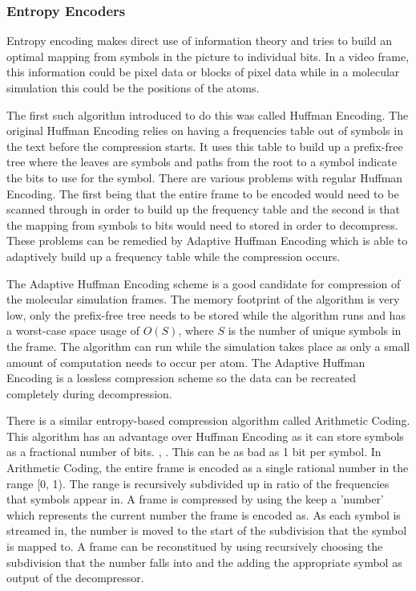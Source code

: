 \documentclass[twocolumn, a4paper,10pt]{article}
\begin{document}
\subsubsection*{Entropy Encoders}

Entropy encoding makes direct use of information theory and tries to build an optimal mapping from symbols in the picture to individual bits. In a video frame, this information could be pixel data or blocks of pixel data while in a molecular simulation this could be the positions of the atoms. 

The first such algorithm introduced to do this was called Huffman Encoding\cite{citeulike:1320251}. The original Huffman Encoding relies on having a frequencies table out of symbols in the text before the compression starts. It uses this table to build up a prefix-free tree where the leaves are symbols and paths from the root to a symbol indicate the bits to use for the symbol. There are various problems with regular Huffman Encoding. The first being that the entire frame to be encoded would need to be scanned through in order to build up the frequency table\cite{RefWorks:1} and the second is that the mapping from symbols to bits would need to stored in order to decompress. These problems can be remedied by Adaptive Huffman Encoding which is able to adaptively build up a frequency table while the compression occurs. \cite{42227}

The Adaptive Huffman Encoding scheme is a good candidate for compression of the molecular simulation frames. The memory footprint of the algorithm is very low, only the prefix-free tree needs to be stored while the algorithm runs and has a worst-case space usage of $O(S)$, where $S$ is the number of unique symbols in the frame. The algorithm can run while the simulation takes place as only a small amount of computation needs to occur per atom. The Adaptive Huffman Encoding is a lossless compression scheme so the data can be recreated completely during decompression.

There is a similar entropy-based compression algorithm called Arithmetic Coding. This algorithm has an advantage over Huffman Encoding as it can store symbols as a fractional number of bits. \cite{RefWorks:1}, \cite{RefWorks:3}. This can be as bad as 1 bit per symbol. In Arithmetic Coding, the entire frame is encoded as a single rational number in the range [0, 1). The range is recursively subdivided up in ratio of the frequencies that symbols appear in. A frame is compressed by using the keep a 'number' which represents the current number the frame is encoded as. As each symbol is streamed in, the number is moved to the start of the subdivision that the symbol is mapped to. A frame can be reconstitued by using recursively choosing the subdivision that the number falls into and the adding the appropriate symbol as output of the decompressor.
\end{document}
